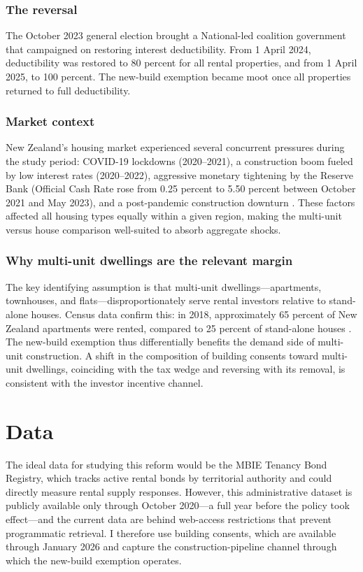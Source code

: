 \documentclass[12pt]{article}
\begin{document}
\subsubsection*{The reversal} The October 2023 general election brought a National-led coalition government that campaigned on restoring interest deductibility. From 1 April 2024, deductibility was restored to 80 percent for all rental properties, and from 1 April 2025, to 100 percent. The new-build exemption became moot once all properties returned to full deductibility.

\subsubsection*{Market context} New Zealand's housing market experienced several concurrent pressures during the study period: COVID-19 lockdowns (2020--2021), a construction boom fueled by low interest rates (2020--2022), aggressive monetary tightening by the Reserve Bank (Official Cash Rate rose from 0.25 percent to 5.50 percent between October 2021 and May 2023), and a post-pandemic construction downturn \citep{RBNZ2022}. These factors affected all housing types equally within a given region, making the multi-unit versus house comparison well-suited to absorb aggregate shocks.

\subsubsection*{Why multi-unit dwellings are the relevant margin} The key identifying assumption is that multi-unit dwellings---apartments, townhouses, and flats---disproportionately serve rental investors relative to stand-alone houses. Census data confirm this: in 2018, approximately 65 percent of New Zealand apartments were rented, compared to 25 percent of stand-alone houses \citep{StatsNZ2018}. The new-build exemption thus differentially benefits the demand side of multi-unit construction. A shift in the composition of building consents toward multi-unit dwellings, coinciding with the tax wedge and reversing with its removal, is consistent with the investor incentive channel.


\section{Data}
\label{sec:data}

The ideal data for studying this reform would be the MBIE Tenancy Bond Registry, which tracks active rental bonds by territorial authority and could directly measure rental supply responses. However, this administrative dataset is publicly available only through October 2020---a full year before the policy took effect---and the current data are behind web-access restrictions that prevent programmatic retrieval. I therefore use building consents, which are available through January 2026 and capture the construction-pipeline channel through which the new-build exemption operates.
\end{document}
